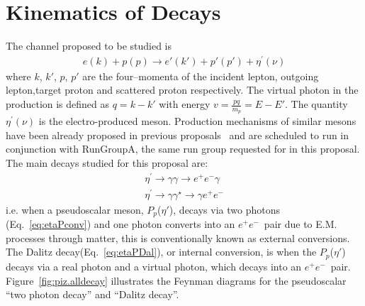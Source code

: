 \documentclass[11pt,a4paper,twocolumn]{article}
\def\etaP{\eta^{\prime}}
\def\epemT{$ e^+e^-  $}
\begin{document}
\section{Kinematics of Decays}\label{sec:kinematics}
The channel proposed to be studied is 
\begin{align}
e(k)+p(p)\to e'(k') + p'(p') +\etaP(\nu) \label{eq:etaP} 
\end{align}
where $k$, $k'$, $p$, $p'$ are the four–momenta of the incident lepton, outgoing lepton,target proton and scattered proton respectively. The virtual photon in the production is defined as $q=k-k'$ with energy $v = \frac{pq}{m_p} = E - E'$. The quantity $\etaP(\nu)$ is the electro-produced meson. Production mechanisms of similar mesons have been already proposed in previous proposals~\cite{clas.proposal.eta,clas.proposal.phi} and are scheduled to run in conjunction with RunGroupA, the same run group requested for in this proposal.
The main decays studied for this proposal are:
\begin{align}
\etaP \rightarrow \gamma \gamma \to e^+e^- \gamma \label{eq:etaPconv} \\
\etaP \rightarrow \gamma \gamma^\star \to \gamma e^+e^- \label{eq:etaPDal} 
\end{align}
i.e. when a pseudoscalar meson, $P_p$($\eta'$), decays via two photons (Eq.~\ref{eq:etaPconv}) and one photon converts into an \epemT \ pair due to E.M. processes through matter, this is conventionally known as external conversions. The Dalitz decay(Eq.~\ref{eq:etaPDal}), or internal conversion, is when the $P_p$($\eta'$) decays via a real photon and a virtual photon, which decays into an \epemT \ pair.
Figure~\ref{fig:piz.alldecay} illustrates the Feynman diagrams for the pseudoscalar ``two photon decay'' and  ``Dalitz decay''.
\end{document}
